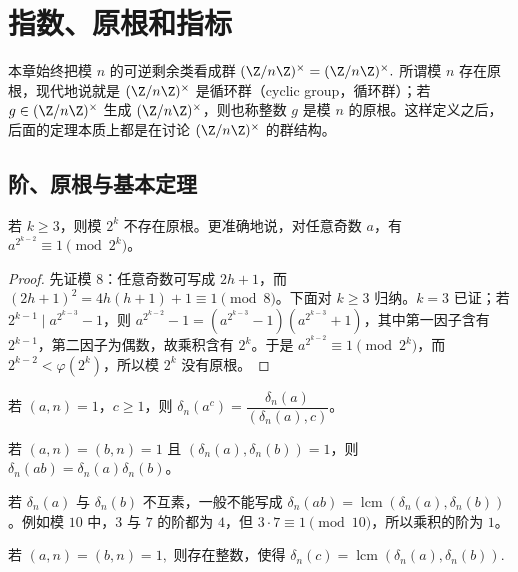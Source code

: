\chapter{指数、原根和指标}

本章始终把模 $n$ 的可逆剩余类看成群
\(
  \U n=(\Z/n\Z)^\times .
\)
所谓模 $n$ 存在原根，现代地说就是 $\U n$ 是循环群（cyclic group，循环群）；若
$g\in \U n$ 生成 $\U n$，则也称整数 $g$ 是模 $n$ 的原根。这样定义之后，后面的定理本质上都是在讨论
$\U n$ 的群结构。

\section{阶、原根与基本定理}

\begin{theorem}[二的高次幂没有原根]
若 $k\ge 3$，则模 $2^k$ 不存在原根。更准确地说，对任意奇数 $a$，有 $a^{2^{k-2}}\equiv 1\pmod {2^k}$。
\end{theorem}

\begin{proof}
先证模 $8$：任意奇数可写成 $2h+1$，而 $(2h+1)^2=4h(h+1)+1\equiv 1\pmod 8$。下面对 $k\ge3$ 归纳。$k=3$ 已证；若 $2^{k-1}\mid a^{2^{k-3}}-1$，则
$a^{2^{k-2}}-1=(a^{2^{k-3}}-1)(a^{2^{k-3}}+1)$，其中第一因子含有 $2^{k-1}$，第二因子为偶数，故乘积含有 $2^k$。于是 $a^{2^{k-2}}\equiv1\pmod {2^k}$，而 $2^{k-2}<\varphi(2^k)$，所以模 $2^k$ 没有原根。
\end{proof}

\begin{proposition}[幂的阶]
若 $(a,n)=1$，$c\ge 1$，则 $\delta_n(a^c)=\dfrac{\delta_n(a)}{(\delta_n(a),c)}$。
\end{proposition}

\begin{proposition}[互素阶的乘积]
若 $(a,n)=(b,n)=1$ 且 $(\delta_n(a),\delta_n(b))=1$，则 $\delta_n(ab)=\delta_n(a)\delta_n(b)$。
\end{proposition}

\begin{remark}
若 $\delta_n(a)$ 与 $\delta_n(b)$ 不互素，一般不能写成 $\delta_n(ab)=\operatorname{lcm}(\delta_n(a),\delta_n(b))$。例如模 $10$ 中，$3$ 与 $7$ 的阶都为 $4$，但
$3\cdot 7\equiv 1\pmod {10}$，所以乘积的阶为 $1$。
\end{remark}

\begin{theorem}[阶的最小公倍数可以实现]
若
\(
  (a,n)=(b,n)=1,
\)
则存在整数，使得
\(
  \delta_n(c)=\operatorname{lcm}(\delta_n(a),\delta_n(b)).
\)
\end{theorem}

